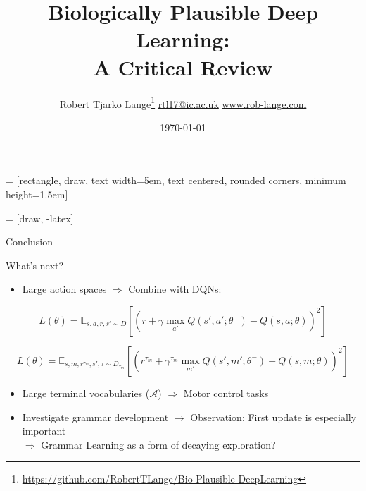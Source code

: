 \documentclass[dvipsnames, usenames]{beamer}
\begin{document}

 = [rectangle, draw, 
    text width=5em, text centered, rounded corners, minimum height=1.5em]
    
 = [draw, -latex]

\title{Biologically Plausible Deep Learning: \\ A Critical Review}
\subtitle{}

\author{\texorpdfstring{Robert Tjarko Lange\thanks{\url{https://github.com/RobertTLange/Bio-Plausible-DeepLearning}}
						\newline\url{rtl17@ic.ac.uk}
						\newline\url{www.rob-lange.com}
	}
	{Author}}


\date{\today}



\begin{frame}[noframenumbering]
\titlepage
\end{frame}

\begin{frame}{Conclusion}
\vspace{-0.5cm}

\end{frame}


\begin{frame}{What's next?}
\vspace{-0.5cm}

\begin{itemize}
	\item Large action spaces $\Rightarrow$ Combine with DQNs:
\end{itemize}

	$$L(\theta) = \mathbb{E}_{s,a,r,s' \sim D} \left[(r + \gamma \max_{a'} Q(s',a';\theta^-) - Q(s,a; \theta))^2\right]$$
	
	$$L(\theta) = \mathbb{E}_{s,m,r^{\tau_m},s', \tau \sim D_{\tau_m}} \left[(r^{\tau_m} + \gamma^{\tau_m} \max_{m'} Q(s',m';\theta^-) - Q(s,m; \theta))^2\right]$$
\begin{itemize}	
	\item Large terminal vocabularies ($\mathcal{A}$) $\Rightarrow$ Motor control tasks
	\item Investigate grammar development $\to$ Observation: First update is especially important \\ $\Rightarrow$ Grammar Learning as a form of decaying exploration?
\end{itemize}

\end{frame}
\end{document}

